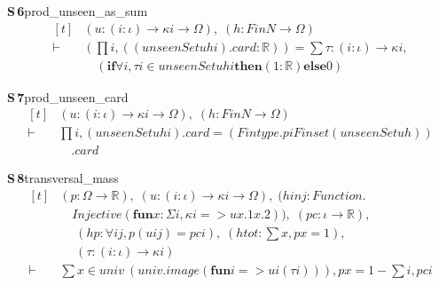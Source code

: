\documentclass[conference]{IEEEtran}
\theoremstyle{definition}
\newcommand{\lean}[1]{\textsf{\footnotesize #1}}
\begin{document}
\noindent\textbf{S\,6}\quad\lean{prod\_unseen\_as\_sum}
{\footnotesize\[ \begin{aligned}[t]
&(\mathit{u} : (\mathit{i} : \iota ) \to \kappa \mathit{i} \to \Omega ),\; (\mathit{h} : \mathit{Fin} \mathit{N} \to \Omega )\\
\vdash\;&(\textstyle\prod \mathit{i}, ((\mathit{unseenSet} \mathit{u} \mathit{h} \mathit{i}).\mathit{card} : \mathbb{R} )) = \textstyle\sum \tau : (\mathit{i} : \iota ) \to \kappa \mathit{i},\\
&\quad (\mathbf{if} \forall \mathit{i}, \tau \mathit{i} \in \mathit{unseenSet} \mathit{u} \mathit{h} \mathit{i} \mathbf{then} (1:\mathbb{R} ) \mathbf{else} 0)
\end{aligned} \]}

\noindent\textbf{S\,7}\quad\lean{prod\_unseen\_card}
{\footnotesize\[ \begin{aligned}[t]
&(\mathit{u} : (\mathit{i} : \iota ) \to \kappa \mathit{i} \to \Omega ),\; (\mathit{h} : \mathit{Fin} \mathit{N} \to \Omega )\\
\vdash\;&\textstyle\prod \mathit{i}, (\mathit{unseenSet} \mathit{u} \mathit{h} \mathit{i}).\mathit{card} = (\mathit{Fintype}.\mathit{piFinset} (\mathit{unseenSet} \mathit{u} \mathit{h}))\\
&\quad .\mathit{card}
\end{aligned} \]}

\noindent\textbf{S\,8}\quad\lean{transversal\_mass}
{\footnotesize\[ \begin{aligned}[t]
&(\mathit{p} : \Omega \to \mathbb{R} ),\; (\mathit{u} : (\mathit{i} : \iota ) \to \kappa \mathit{i} \to \Omega ),\; (\mathit{hinj} : \mathit{Function}.\\
&\quad \mathit{Injective} (\mathbf{fun} \mathit{x} : \Sigma \mathit{i}, \kappa \mathit{i} => \mathit{u} \mathit{x}.1 \mathit{x}.2)),\; (\mathit{pc} : \iota \to \mathbb{R} ),\\
&\quad \; (\mathit{hp} : \forall \mathit{i} \mathit{j}, \mathit{p} (\mathit{u} \mathit{i} \mathit{j}) = \mathit{pc} \mathit{i}),\; (\mathit{htot} : \textstyle\sum \mathit{x}, \mathit{p} \mathit{x} = 1),\\
&\quad \; (\tau : (\mathit{i} : \iota ) \to \kappa \mathit{i})\\
\vdash\;&\textstyle\sum \mathit{x} \in \mathit{univ} \ (\mathit{univ}.\mathit{image} (\mathbf{fun} \mathit{i} => \mathit{u} \mathit{i} (\tau \mathit{i}))), \mathit{p} \mathit{x} = 1 - \textstyle\sum \mathit{i}, \mathit{pc} \mathit{i}
\end{aligned} \]}
\end{document}
